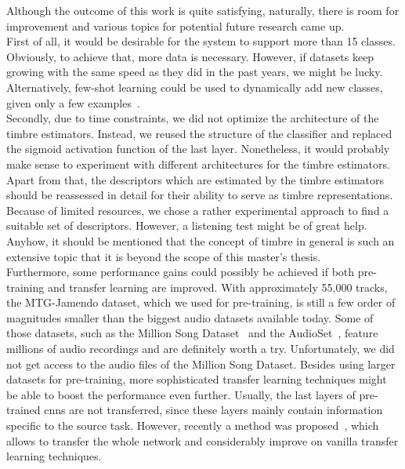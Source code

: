 Although the outcome of this work is quite satisfying, naturally, there is room for improvement and various topics for potential future research came up.\\

First of all, it would be desirable for the system to support more than 15 classes. Obviously, to achieve that, more data is necessary. However, if datasets keep growing with the same speed as they did in the past years, we might be lucky. Alternatively, few-shot learning could be used to dynamically add new classes, given only a few examples~\cite{garcia2021leveraging}.\\

Secondly, due to time constraints, we did not optimize the architecture of the timbre estimators. Instead, we reused the structure of the classifier and replaced the sigmoid activation function of the last layer. Nonetheless, it would probably make sense to experiment with different architectures for the timbre estimators.\\

Apart from that, the descriptors which are estimated by the timbre estimators should be reassessed in detail for their ability to serve as timbre representations. Because of limited resources, we chose a rather experimental approach to find a suitable set of descriptors. However, a listening test might be of great help. Anyhow, it should be mentioned that the concept of timbre in general is such an extensive topic that it is beyond the scope of this master's thesis.\\

Furthermore, some performance gains could possibly be achieved if both pre-training and transfer learning are improved. With approximately 55,000 tracks, the MTG-Jamendo dataset, which we used for pre-training, is still a few order of magnitudes smaller than the biggest audio datasets available today. Some of those datasets, such as the Million Song Dataset~\cite{bertin2011msd} and the AudioSet~\cite{gemmeke2017audioset}, feature millions of audio recordings and are definitely worth a try. Unfortunately, we did not get access to the audio files of the Million Song Dataset. Besides using larger datasets for pre-training, more sophisticated transfer learning techniques might be able to boost the performance even further. Usually, the last layers of pre-trained \glspl{cnn} are not transferred, since these layers mainly contain information specific to the source task. However, recently a method was proposed~\cite{you2020co}, which allows to transfer the whole network and considerably improve on vanilla transfer learning techniques.\\

